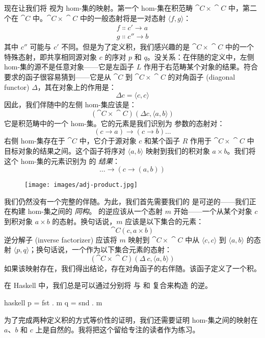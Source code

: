 现在让我们将  视为 hom-集的映射。第一个 hom-集在积范畴 $\cat{C}\times{}\cat{C}$ 中，第二个在 $\cat{C}$ 中。$\cat{C}\times{}\cat{C}$ 中的一般态射将是一对态射 $\langle f, g \rangle$：
\begin{gather*}
  f \Colon c' \to a \\
  g \Colon c'' \to b
\end{gather*}
其中 $c''$ 可能与 $c'$ 不同。但是为了定义积，我们感兴趣的是 $\cat{C}\times{}\cat{C}$ 中的一个特殊态射，即共享相同源对象 $c$ 的序对 $p$ 和 $q$。没关系：在伴随的定义中，左侧 hom-集的源不是任意对象——它是左函子 $L$ 作用于右范畴某个对象的结果。符合要求的函子很容易猜到——它是从 $\cat{C}$ 到 $\cat{C}\times{}\cat{C}$ 的对角函子 (diagonal functor) $\Delta$，其在对象上的作用是：
\[\Delta c = \langle c, c \rangle\]
因此，我们伴随中的左侧 hom-集应该是：
\[(\cat{C}\times{}\cat{C})(\Delta c, \langle a, b \rangle)\]
它是积范畴中的一个 hom-集。它的元素是我们识别为  参数的态射对：
\[(c \to a) \to (c \to b) \ldots{}\]
右侧 hom-集存在于 $\cat{C}$ 中，它介于源对象 $c$ 和某个函子 $R$ 作用于 $\cat{C}\times{}\cat{C}$ 中目标对象的结果之间。这个函子将序对 $\langle a, b \rangle$ 映射到我们的积对象 $a\times{}b$。我们将这个 hom-集的元素识别为  的 \emph{结果}：
\[\ldots{} \to (c \to (a, b))\]

\begin{figure}[H]
  \centering
  \texttt{[image: images/adj-product.jpg]}
\end{figure}

\noindent
我们仍然没有一个完整的伴随。为此，我们首先需要我们的  是可逆的——我们正在构建 hom-集之间的 \emph{同构}。 的逆应该从一个态射 $m$ 开始——一个从某个对象 $c$ 到积对象 $a\times{}b$ 的态射。换句话说，$m$ 应该是以下集合的元素：
\[\cat{C}(c, a\times{}b)\]
逆分解子 (inverse factorizer) 应该将 $m$ 映射到 $\cat{C}\times{}\cat{C}$ 中从 $\langle c, c \rangle$ 到 $\langle a, b \rangle$ 的态射 $\langle p, q \rangle$；换句话说，一个作为以下集合元素的态射：
\[(\cat{C}\times{}\cat{C})(\Delta\ c, \langle a, b \rangle)\]
如果该映射存在，我们得出结论，存在对角函子的右伴随。该函子定义了一个积。

在 Haskell 中，我们总是可以通过分别将  与  和  复合来构造  的逆。

\begin{snip}{haskell}
p = fst . m
q = snd . m
\end{snip}
为了完成两种定义积的方式等价性的证明，我们还需要证明 hom-集之间的映射在 $a$、$b$ 和 $c$ 上是自然的。我将把这个留给专注的读者作为练习。

